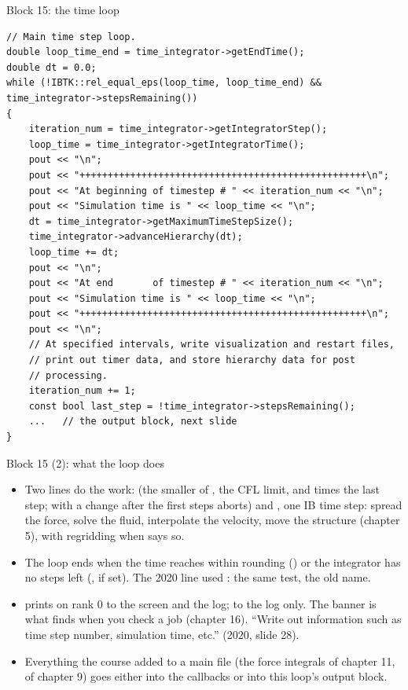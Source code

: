 \documentclass[aspectratio=169,11pt]{beamer}
\begin{document}
\begin{frame}[fragile]{Block 15: the time loop}
\label{fr:loop}
\begin{lstlisting}[style=cpptiny]
// Main time step loop.
double loop_time_end = time_integrator->getEndTime();
double dt = 0.0;
while (!IBTK::rel_equal_eps(loop_time, loop_time_end) && time_integrator->stepsRemaining())
{
    iteration_num = time_integrator->getIntegratorStep();
    loop_time = time_integrator->getIntegratorTime();
    pout << "\n";
    pout << "+++++++++++++++++++++++++++++++++++++++++++++++++++\n";
    pout << "At beginning of timestep # " << iteration_num << "\n";
    pout << "Simulation time is " << loop_time << "\n";
    dt = time_integrator->getMaximumTimeStepSize();
    time_integrator->advanceHierarchy(dt);
    loop_time += dt;
    pout << "\n";
    pout << "At end       of timestep # " << iteration_num << "\n";
    pout << "Simulation time is " << loop_time << "\n";
    pout << "+++++++++++++++++++++++++++++++++++++++++++++++++++\n";
    pout << "\n";
    // At specified intervals, write visualization and restart files,
    // print out timer data, and store hierarchy data for post
    // processing.
    iteration_num += 1;
    const bool last_step = !time_integrator->stepsRemaining();
    ...   // the output block, next slide
}
\end{lstlisting}
\end{frame}

\begin{frame}{Block 15 (2): what the loop does}
\label{fr:loop2}
\footnotesize
\begin{itemize}
  \item Two lines do the work:  (the smaller of , the CFL limit, and  times the last step; with  a change after the first steps aborts) and , one IB time step: spread the force, solve the fluid, interpolate the velocity, move the structure (chapter 5), with regridding when  says so.
  \item The loop ends when the time reaches  within rounding () or the integrator has no steps left (, if set). The 2020 line used : the same test, the old name.
  \item {} prints on rank $0$ to the screen and the log;  to the log only. The \code{+++} banner is what  finds when you check a job (chapter 16). ``Write out information such as time step number, simulation time, etc.'' (2020, slide 28).
  \item Everything the course added to a main file (the force integrals of chapter 11,  of chapter 9) goes either into the callbacks or into this loop's output block.
\end{itemize}
\end{frame}
\end{document}
